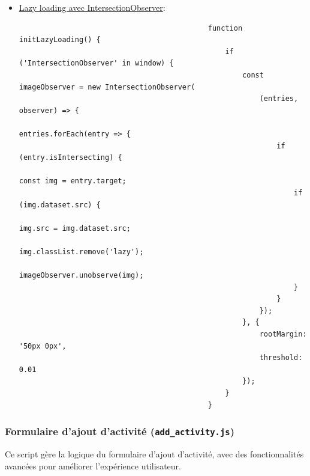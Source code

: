 \documentclass[a4paper,11pt]{article}
\begin{document}
\begin{itemize}
\begin{itemize}
                                \item \underline{Lazy loading avec IntersectionObserver}:
                                    \begin{tcolorbox}[colback=lightgray!5, colframe=gray!80, left=-80mm, right=5mm, top=2mm, bottom=0mm, boxrule=0.1mm]
                                        \begin{verbatim}
                                            function initLazyLoading() {
                                                if ('IntersectionObserver' in window) {
                                                    const imageObserver = new IntersectionObserver(
                                                        (entries, observer) => {
                                                        entries.forEach(entry => {
                                                            if (entry.isIntersecting) {
                                                                const img = entry.target;
                                                                if (img.dataset.src) {
                                                                    img.src = img.dataset.src;
                                                                    img.classList.remove('lazy');
                                                                    imageObserver.unobserve(img);
                                                                }
                                                            }
                                                        });
                                                    }, {
                                                        rootMargin: '50px 0px',
                                                        threshold: 0.01
                                                    });
                                                }
                                            }
                                        \end{verbatim}
                                    \end{tcolorbox}
                            \end{itemize}
                    \end{itemize}
                
                \subsubsection{Formulaire d'ajout d'activité (\texttt{add\_activity.js})}
                \noindent Ce script gère la logique du formulaire d'ajout d'activité, avec des fonctionnalités avancées pour améliorer l'expérience utilisateur.
\end{document}
